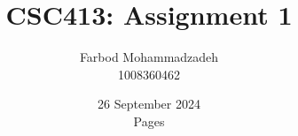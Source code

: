 \documentclass{article}
\title{CSC413: Assignment 1}
\author{Farbod Mohammadzadeh\\
    1008360462}
\date{26 September 2024\\ \pageref{LastPage} Pages}
\begin{document}
\Large
\maketitle
\newpage
% 
% 
% 
% 
% 
\end{document}
